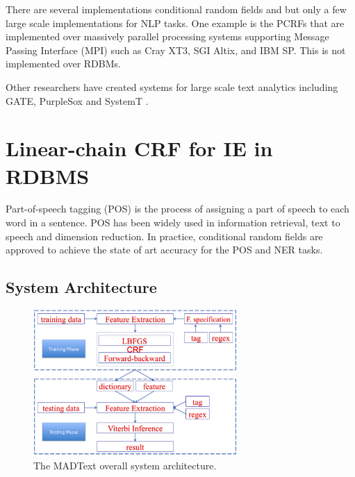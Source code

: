 \documentclass[11pt,letterpaper]{article}
\begin{document}
There are several implementations conditional random fields and but only a few 
large scale implementations for NLP tasks.
One example is the PCRFs \cite{phan2004flexcrfs} that are implemented over
massively parallel processing systems supporting Message Passing Interface (MPI) such as 
Cray XT3, SGI Altix, and IBM SP.
This is not implemented over RDBMs.

Other researchers have created systems for large scale text analytics including 
GATE, PurpleSox and SystemT
\cite{Cunningham2011a,Bohannon:2009:PSE:1519103.1519107,Li:2011:SDI:2002440.2002459}. 


\section{Linear-chain CRF for IE in RDBMS}
Part-of-speech tagging (POS) is the process of assigning 
a part of speech to each word in a sentence. POS has been widely used in information retrieval, text to speech and dimension reduction. 
In practice, conditional random fields are approved to achieve the state of art accuracy for the POS and NER tasks.

\subsection{System Architecture}
\begin{figure}
\centering
\includegraphics[height=15em]{system.png}
\caption{The MADText overall system architecture.}
\label{fig:systemarch}
\end{figure}
\end{document}

